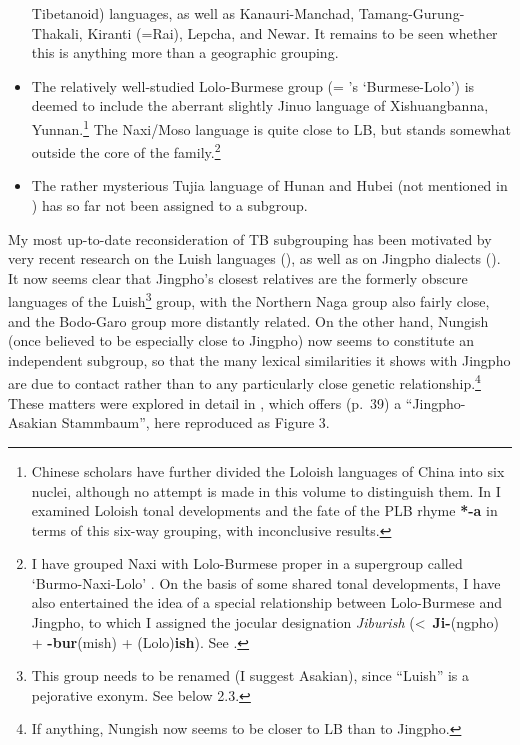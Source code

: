 \begin{itemize}
\mbox{Tibetanoid}) languages, as well as Kanauri-Manchad, Tamang-Gurung-Thakali,
Kiranti (=Rai), Lepcha, and Newar. It remains to be seen whether this is anything more than a geographic grouping.
\item The relatively well-studied Lolo-Burmese group (= \textit{}’s ‘Burmese-Lolo’) is
deemed to include the aberrant slightly Jinuo language of Xishuangbanna,
Yunnan.\footnote{Chinese scholars have further divided the Loloish languages of
China into six nuclei, although no attempt is made in this volume to distinguish
them. In \citealt{JAM-PLBA} I examined Loloish tonal developments
and the fate of the PLB rhyme \textbf{*-a} in terms of this six-way grouping, with
inconclusive results.}  The Naxi/Moso language is quite close to LB, but stands
somewhat outside the core of the family.\footnote{I have grouped Naxi with
Lolo-Burmese proper in a supergroup called ‘Burmo-Naxi-Lolo’ \citealt{JAM-JR}.
On the basis of some shared tonal developments, I have also entertained the idea
of a special relationship between Lolo-Burmese and Jingpho, to which I assigned
the jocular designation \textit{Jiburish} (<~\textbf{Ji-}(ngpho)
+ \textbf{-bur}(mish) + (Lolo)\textbf{ish}). See \citealt{JAM-TJLB,JAM-JR}.}
\item The rather mysterious Tujia language of Hunan and Hubei (not mentioned in \textit{}) has so
far not been assigned to a subgroup.
\end{itemize}

My most up-to-date reconsideration of TB subgrouping has been motivated by very recent research on the Luish languages (\citealt{HK-Sak,Huziwara2012,DS-Kadu}), as well as on Jingpho dialects (\citealt{KK-TSJD}). It now seems clear that Jingpho’s closest relatives are the formerly obscure languages of the Luish\footnote{This group needs to be renamed (I suggest Asakian), since “Luish” is a pejorative exonym. See below 2.3.} group, with the Northern Naga group also fairly close, and the Bodo-Garo group more distantly related. On the other hand, Nungish (once believed to be especially close to Jingpho) now seems to constitute an independent subgroup, so that the many lexical similarities it shows with Jingpho are due to contact rather than to any particularly close genetic relationship.\footnote{If anything, Nungish now seems to be closer to LB than to Jingpho.} These matters were explored in detail in \citealt{JAM-RGPJ}, which offers (p.\ 39) a “Jingpho-Asakian Stammbaum”, here reproduced as Figure 3.


